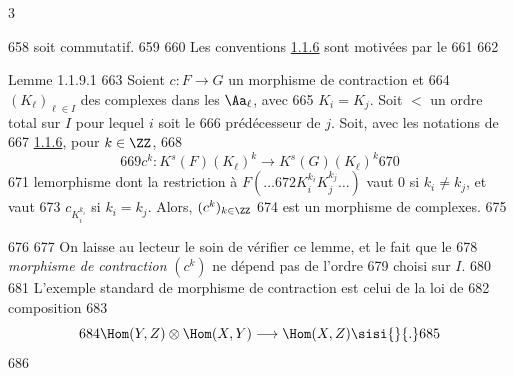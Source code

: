 3	\documentclass[10pt]{../fichiers-configuration-latex/smfart}
\begin{document}
   658	soit commutatif.
   659	
   660	Les conventions \hyperref[XVII.subsubsec1.1.6]{1.1.6} sont motivées par le
   661	
   662	\begin{enonce*}{Lemme 1.1.9.1}
   663	Soient $c:F\rightarrow G$ un morphisme de contraction et
   664	$(K_{\ell})_{\ell \in I}$ des complexes dans les $\Aa_{\ell}$, avec
   665	$K_{i}=K_{j}$. Soit $<$ un ordre total sur $I$ pour lequel $i$ soit le
   666	prédécesseur de $j$. Soit, avec les notations de
   667	\hyperref[XVII.subsubsec1.1.6]{1.1.6}, pour $k\in \ZZ$,
   668	\[
   669	c^{k}:K^{s}(F)(K_{\ell})^{k}\longrightarrow K^{s}(G)(K_{\ell})^{k}
   670	\]
   671	le\pageoriginale morphisme dont la restriction à $F(\ldots
   672	K_{i}^{k_i}K_{j}^{k_j}\ldots)$ vaut $0$ si $k_i\neq k_j$, et vaut
   673	$c_{K_i^{k_i}}$ si $k_{i}=k_{j}$. Alors, $(c^{k})_{k\in \ZZ}$
   674	est un morphisme de complexes.
   675	\end{enonce*}
   676	
   677	On laisse au lecteur le soin de vérifier ce lemme, et le fait que le
   678	\emph{morphisme de contraction} $(c^{k})$ ne dépend pas de l'ordre
   679	choisi sur $I$.
   680	
   681	L'exemple standard de morphisme de contraction est celui de la loi de
   682	composition
   683	\[
   684	\Hom(Y,Z)\otimes \Hom(X,Y)\longrightarrow \Hom(X,Z)\sisi{}{.}
   685	\]
   686	
\end{document}
